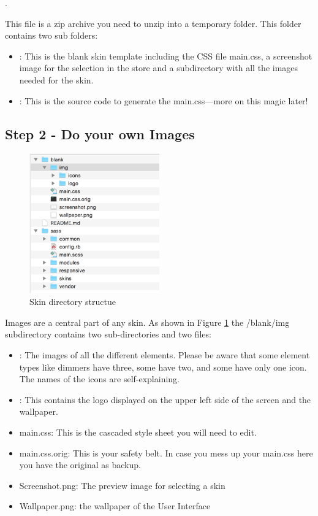 .


This file is a zip archive you need to unzip into a temporary folder. This folder contains 
two sub folders:

\begin{itemize}
\item {}: This is the blank skin template including the CSS file main.css, a screenshot 
image for the selection in the store and a subdirectory with all the images needed for the skin.
\item {}: This is the source code to generate the main.css---more on this magic later!
\end{itemize}

\subsection{Step 2 - Do your own Images}


\begin{figure}
\begin{center}
\includegraphics[width=0.5\textwidth]{pngs/cap10/skin2.png}
\caption{Skin directory structue}
\label{skin2}
\end{center}
\end{figure}

Images are a central part of any skin. As shown in Figure \ref{skin2} the /blank/img subdirectory 
contains two sub-directories and two files:

\begin{itemize}
\item {}: The images of all the different elements. Please be aware that some element 
types like dimmers have three, some have two, and some have only one icon. The names of the 
icons are self-explaining.
\item {}: This contains the logo displayed on the upper left side of the screen and the wallpaper.
\item main.css: This is the cascaded style sheet you will need to edit.
\item main.css.orig: This is your safety belt. In case you mess up your main.css here you have the original as backup.
\item Screenshot.png: The preview image for selecting a skin
\item Wallpaper.png: the wallpaper of the User Interface
\end{itemize}

